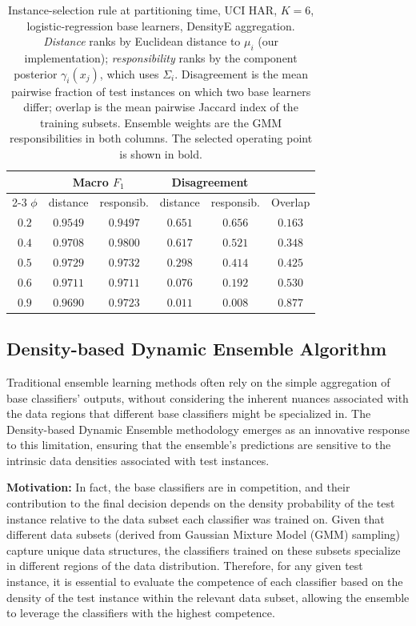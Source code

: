 \documentclass[lettersize,journal]{IEEEtran}
\begin{document}
	\begin{table}[!t]
		\centering
		\caption{Instance-selection rule at partitioning time, UCI HAR, $K = 6$, logistic-regression
		base learners, DensityE aggregation. \emph{Distance} ranks by Euclidean distance to $\mu_i$
		(our implementation); \emph{responsibility} ranks by the component posterior
		$\gamma_i(x_j)$, which uses $\Sigma_i$. Disagreement is the mean pairwise fraction of test
		instances on which two base learners differ; overlap is the mean pairwise Jaccard index of
		the training subsets. Ensemble weights are the GMM responsibilities in both columns. The
		selected operating point is shown in bold.}
		\label{tab:selection_rule}
		\begin{tabular}{cccccc}
			\hline
			& \multicolumn{2}{c}{Macro $F_1$} & \multicolumn{2}{c}{Disagreement} & \\
			\cline{2-3}\cline{4-5}
			$\phi$ & distance & responsib. & distance & responsib. & Overlap \\
			\hline
			$0.2$ & $0.9549$ & $0.9497$ & $0.651$ & $0.656$ & $0.163$ \\
			$0.4$ & $0.9708$ & $0.9800$ & $0.617$ & $0.521$ & $0.348$ \\
			$0.5$ & $\mathbf{0.9729}$ & $0.9732$ & $0.298$ & $0.414$ & $0.425$ \\
			$0.6$ & $0.9711$ & $0.9711$ & $0.076$ & $0.192$ & $0.530$ \\
			$0.9$ & $0.9690$ & $0.9723$ & $0.011$ & $0.008$ & $0.877$ \\
			\hline
		\end{tabular}
	\end{table}

	\subsection{Density-based Dynamic Ensemble Algorithm}
	\label{subsec:ddel}
	\noindent Traditional ensemble learning methods often rely on the simple aggregation of base classifiers’ outputs, without considering the inherent nuances
	associated with the data regions that different base classifiers might be specialized in. The Density-based Dynamic Ensemble methodology emerges
	as an innovative response to this limitation, ensuring that the ensemble’s
	predictions are sensitive to the intrinsic data densities associated with test
	instances.
	
	\textbf{Motivation:} In fact, the base classifiers are in competition, and their contribution to the final decision depends on the density probability of the test instance relative to the data subset each classifier was trained on. Given that different data subsets (derived from Gaussian Mixture Model (GMM) sampling) capture unique data structures, the classifiers trained on these subsets specialize in different regions of the data distribution. Therefore, for any given test instance, it is essential to evaluate the competence of each classifier based on the density of the test instance within the relevant data subset, allowing the ensemble to leverage the classifiers with the highest competence.
	
\end{document}
